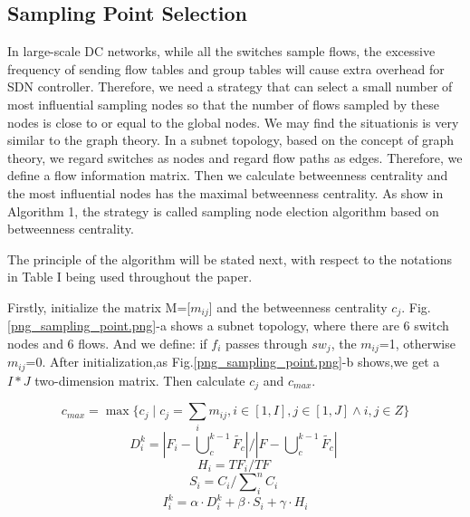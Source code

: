 \documentclass[conference,compsoc]{IEEEtran}
\begin{document}
\subsection{Sampling Point Selection} 

In large-scale DC networks, while all the switches sample flows, the excessive frequency of sending flow tables and group tables will cause extra overhead for SDN controller. Therefore, we need a strategy that can select a small number of most influential sampling nodes so that the number of flows sampled by these nodes is close to or equal to the  global nodes. 
We may find the situationis is very similar to the graph theory. In a subnet topology, based on the concept of graph theory, we regard switches as nodes and regard flow paths as edges. Therefore, we define a flow information matrix. Then we calculate betweenness centrality and the most influential nodes has the maximal betweenness centrality. As show in Algorithm 1, the strategy is called sampling node election algorithm based on betweenness centrality.

The principle of the algorithm will be stated next, with respect to the notations in Table I being used throughout the paper.

Firstly, initialize the matrix M=[$m_{ij}$] and the betweenness centrality $c_j$. Fig.\ref{png_sampling_point.png}-a shows a subnet topology, where there are 6 switch nodes and 6 flows. And we define: if $f_i$ passes through $sw_j$, the $m_{ij}$=1, otherwise $m_{ij}$=0. After initialization,as Fig.\ref{png_sampling_point.png}-b shows,we get a $I \ast J$ two-dimension matrix. Then calculate $c_j$ and $c_{max}$.

\begin{equation}
 c_{max} = \max\{ c_j \mid c_j=\sum_i{m_{ij}},i\in[1,I],j\in[1,J] \wedge  i,j\in Z\} 
\end{equation}
\begin{equation}
D_{i}^{k}={\left| {{F}_{i}}-\bigcup\nolimits_{c}^{k-1}{\widetilde{{{F}_{c}}}} \right|}/{\left| F-\bigcup\nolimits_{c}^{k-1}{\widetilde{{{F}_{c}}}} \right|}\;
\end{equation}
\begin{equation}
{{H}_{i}}={T{{F}_{i}}}/{TF}\;
\end{equation}
\begin{equation}
{{S}_{i}}={{{C}_{i}}}/{\sum\nolimits_{i}^{n}{{{C}_{i}}}}\;
\end{equation}
\begin{equation}
I_{i}^{k}=\alpha \cdot D_{i}^{k}+\beta \cdot {{S}_{i}}+\gamma \cdot {{H}_{i}}
\end{equation}
\end{document}
